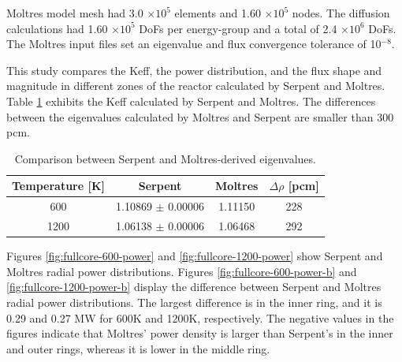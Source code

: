 Moltres model mesh had 3.0 $\times 10^5$ elements and 1.60 $\times 10^5$ nodes.
The diffusion calculations had 1.60 $\times 10^5$ \glspl{DoF} per energy-group and a total of 2.4 $\times 10^6$ DoFs.
The Moltres input files set an eigenvalue and flux convergence tolerance of 10$^{-8}$.

This study compares the \gls{Keff}, the power distribution, and the flux shape and magnitude in different zones of the reactor calculated by Serpent and Moltres.
Table \ref{tab:full-keff} exhibits the \gls{Keff} calculated by Serpent and Moltres.
The differences between the eigenvalues calculated by Moltres and Serpent are smaller than 300 pcm.

\begin{table}[htbp!]
  \centering
  \caption{Comparison between Serpent and Moltres-derived eigenvalues.}
  \begin{tabular}{cccc}
  \toprule
  Temperature [K] & Serpent	& Moltres  & $\Delta \rho$ [pcm] 	\\
  \midrule
			 600  	    & 1.10869 $\pm$ 0.00006  & 1.11150	 &	228		\\
			1200 	      & 1.06138 $\pm$ 0.00006  & 1.06468	 &	292   \\
  \bottomrule
  \end{tabular}
  \label{tab:full-keff}
\end{table}

Figures \ref{fig:fullcore-600-power} and \ref{fig:fullcore-1200-power} show Serpent and Moltres radial power distributions.
Figures \ref{fig:fullcore-600-power-b} and \ref{fig:fullcore-1200-power-b} display the difference between Serpent and Moltres radial power distributions.
The largest difference is in the inner ring, and it is 0.29 and 0.27 MW for 600K and 1200K, respectively.
The negative values in the figures indicate that Moltres' power density is larger than Serpent's in the inner and outer rings, whereas it is lower in the middle ring.

